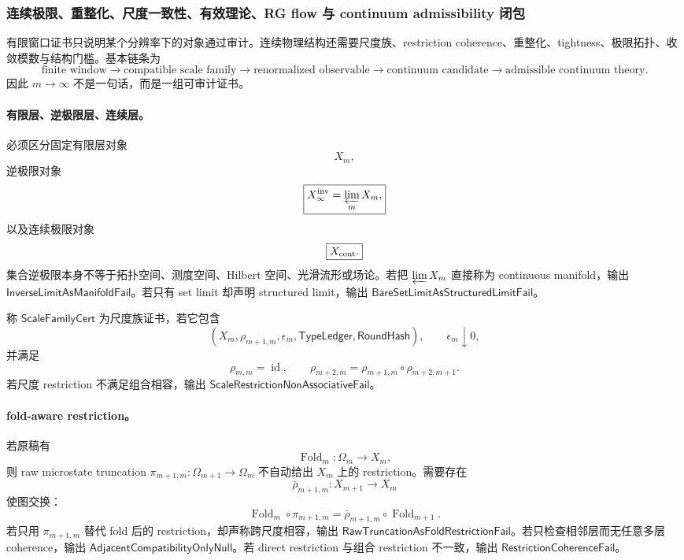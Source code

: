 \subsubsection{连续极限、重整化、尺度一致性、有效理论、RG flow 与 continuum admissibility 闭包}\label{subsubsec:typed-address-biaxial-completion-continuum-renormalization-scale-admissibility-closure}
有限窗口证书只说明某个分辨率下的对象通过审计。连续物理结构还需要尺度族、restriction coherence、重整化、tightness、极限拓扑、收敛模数与结构门槛。基本链条为
\[
\boxed{
\text{finite window}
\to
\text{compatible scale family}
\to
\text{renormalized observable}
\to
\text{continuum candidate}
\to
\text{admissible continuum theory}.
}
\]
因此 \(m\to\infty\) 不是一句话，而是一组可审计证书。

\paragraph{有限层、逆极限层、连续层。}
必须区分固定有限层对象
\[
\boxed{X_m,}
\]
逆极限对象
\[
\boxed{
X_\infty^{\rm inv}=\varprojlim_m X_m,
}
\]
以及连续极限对象
\[
\boxed{X_{\rm cont}.}
\]
集合逆极限本身不等于拓扑空间、测度空间、Hilbert 空间、光滑流形或场论。若把 \(\varprojlim X_m\) 直接称为 continuous manifold，输出 \(\mathsf{InverseLimitAsManifoldFail}\)。若只有 set limit 却声明 structured limit，输出 \(\mathsf{BareSetLimitAsStructuredLimitFail}\)。

\begin{definition}[尺度族证书]\label{def:typed-address-biaxial-completion-scale-family-cert}
称 \(\mathsf{ScaleFamilyCert}\) 为尺度族证书，若它包含
\[
(X_m,\rho_{m+1,m},\epsilon_m,\mathsf{TypeLedger},\mathsf{RoundHash}),
\qquad
\epsilon_m\downarrow0,
\]
并满足
\[
\rho_{m,m}=\operatorname{id},
\qquad
\rho_{m+2,m}=\rho_{m+1,m}\circ\rho_{m+2,m+1}.
\]
若尺度 restriction 不满足组合相容，输出 \(\mathsf{ScaleRestrictionNonAssociativeFail}\)。
\end{definition}

\paragraph{fold-aware restriction。}
若原稿有
\[
\operatorname{Fold}_m:\Omega_m\to X_m,
\]
则 raw microstate truncation \(\pi_{m+1,m}:\Omega_{m+1}\to\Omega_m\) 不自动给出 \(X_m\) 上的 restriction。需要存在
\[
\bar\rho_{m+1,m}:X_{m+1}\to X_m
\]
使图交换：
\[
\boxed{
\operatorname{Fold}_m\circ\pi_{m+1,m}
=
\bar\rho_{m+1,m}\circ\operatorname{Fold}_{m+1}.
}
\]
若只用 \(\pi_{m+1,m}\) 替代 fold 后的 restriction，却声称跨尺度相容，输出 \(\mathsf{RawTruncationAsFoldRestrictionFail}\)。若只检查相邻层而无任意多层 coherence，输出 \(\mathsf{AdjacentCompatibilityOnlyNull}\)。若 direct restriction 与组合 restriction 不一致，输出 \(\mathsf{RestrictionCoherenceFail}\)。


